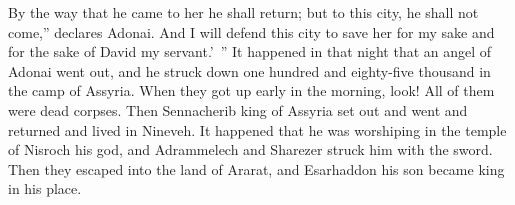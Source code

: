\begin{biblechapter}
\verse By the way that he came to her he shall return; but to this city, he shall not come,” declares Adonai.
\verse And I will defend this city to save her for my sake and for the sake of David my servant.’ ”
 It happened in that night that an angel of Adonai went out, and he struck down one hundred and eighty-five thousand in the camp of Assyria. When they got up early in the morning, look! All of them were dead corpses.
\verse Then Sennacherib king of Assyria set out and went and returned and lived in Nineveh.
\verse It happened that he was worshiping in the temple of Nisroch his god, and Adrammelech and Sharezer struck him with the sword. Then they escaped into the land of Ararat, and Esarhaddon his son became king in his place.
\end{biblechapter}

